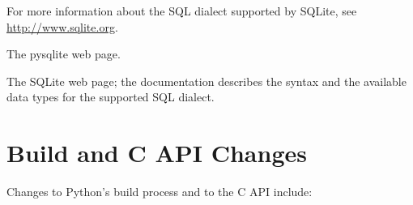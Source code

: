 \documentclass{howto}
\begin{document}
For more information about the SQL dialect supported by SQLite, see 
\url{http://www.sqlite.org}.

\begin{seealso}

{The pysqlite web page.}

{The SQLite web page; the documentation describes the syntax and the
available data types for the supported SQL dialect.}


\end{seealso}


\section{Build and C API Changes\label{build-api}}

Changes to Python's build process and to the C API include:
\end{document}
